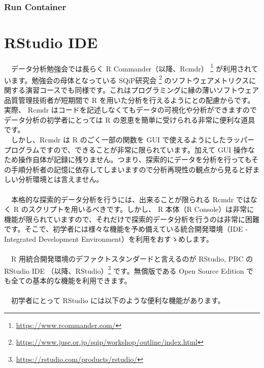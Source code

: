 \documentclass[
  12pt,
]{book}
\DeclareRobustCommand{\href}[2]{#2\footnote{\url{#1}}}
\begin{document}
　

\hypertarget{run-container}{%
\subsection{Run Container}\label{run-container}}

\hypertarget{rstudio-ide}{%
\chapter{RStudio IDE}\label{rstudio-ide}}

　データ分析勉強会では長らく \href{https://www.rcommander.com/}{R Commander（以降、Rcmdr） } が利用されています。勉強会の母体となっている \href{https://www.juse.or.jp/sqip/workshop/outline/index.html}{SQiP研究会 } のソフトウェアメトリクスに関する演習コースでも同様です。これはプログラミングに縁の薄いソフトウェア品質管理技術者が短期間で R を用いた分析を行えるようにとの配慮からです。実際、 Rcmdr はコードを記述しなくてもデータの可視化や分析ができますのでデータ分析の初学者にとっては R の恩恵を簡単に受けられる非常に便利な道具です。\\
　しかし、Rcmdr は R のごく一部の関数を GUI で使えるようにしたラッパープログラムですので、できることが非常に限られています。加えて GUI 操作なため操作自体が記録に残りません。つまり、探索的にデータを分析を行ってもその手順分析者の記憶に依存してしまいますので分析再現性の観点から見ると好ましい分析環境とは言えません。\\
　\\
　本格的な探索的データ分析を行うには、出来ることが限られる Rcmdr ではなく R のスクリプトを用いるべきです。しかし、 R 本体（R Console）は非常に機能が限られていますので、それだけで探索的データ分析を行うのは非常に困難です。そこで、初学者には様々な機能を予め備えている統合開発環境（IDE - Integrated Development Environment）を利用をおすゝめします。\\
　\\
　R 用統合開発環境のデファクトスタンダードと言えるのが RStudio, PBC の \href{https://rstudio.com/products/rstudio/}{RStudio IDE （以降、RStudio）} です。無償版である Open Source Edition でも全ての基本的な機能を利用できます。\\
　\\
　初学者にとって RStudio には以下のような便利な機能があります。
\end{document}
